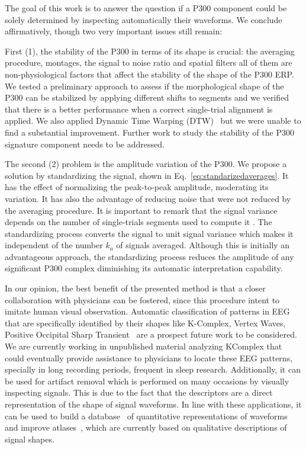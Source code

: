 \documentclass[utf8]{frontiersSCNS} %
\begin{document}
The goal of this work is to answer the question if a P300 component could be solely determined by inspecting automatically their waveforms.  We conclude affirmatively, though two very important issues still remain:

First (1), the stability of the P300 in terms of its shape is crucial: the averaging procedure, montages, the signal to noise ratio and spatial filters all of them are non-physiological factors that affect the stability of the shape of the P300 ERP.  We tested a preliminary approach to assess if the morphological shape of the P300 can be stabilized by applying different shifts to segments and we verified that there is a better performance when a correct single-trial alignment is applied.  We also applied Dynamic Time Warping (DTW)~\citep{Casarotto2005} but we were unable to find a substantial improvement.  Further work to study the stability of the P300 signature component needs to be addressed.

The second (2) problem is the amplitude variation of the P300. We propose a solution by standardizing the signal, shown in Eq.~\ref{eq:standarizedaverages}. It has the effect of normalizing the peak-to-peak amplitude, moderating its variation. It has also the advantage of reducing noise that were not reduced by the averaging procedure.   It is important to remark that the signal variance depends on the number of single-trials segments used to compute it \citep{van2006signal}.  The standardizing process converts the signal to unit signal variance which makes it independent of the number $k_a$ of signals averaged.   Although this is initially an advantageous approach, the standardizing process reduces the amplitude of any significant P300 complex diminishing its automatic interpretation capability.

In our opinion, the best benefit of the presented method is that a closer collaboration with physicians can be fostered, since this procedure intent to imitate human visual observation.  Automatic classification of patterns in EEG that are specifically identified by their shapes like K-Complex, Vertex Waves, Positive Occipital Sharp Transient~\citep{Hartman2005} are a prospect future work to be considered. We are currently working in unpublished material analyzing KComplex that could eventually provide  assistance to physicians to locate these EEG patterns, specially in long recording periods, frequent in sleep research.  
Additionally, it can be used for artifact removal which is performed on many occasions by visually inspecting signals.  This is due to the fact that the descriptors are a direct representation of the shape of signal waveforms. In line with these applications,  it can be used to build a database~\citep{Chavarriaga2017} of quantitative representations of waveforms and improve atlases~\citep{Hartman2005}, which are currently based on qualitative descriptions of signal shapes.
\end{document}
